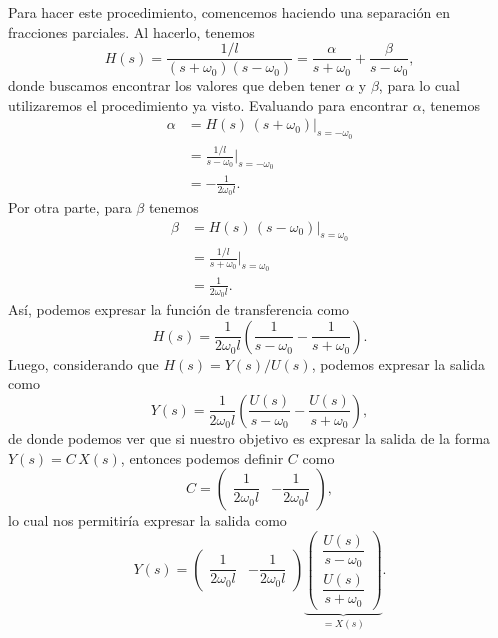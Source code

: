 \documentclass[
  11pt,
  letterpaper,
   addpoints,
  answers
  ]{exam}
\begin{document}
\begin{questions}
\begin{solution}
Para hacer este procedimiento, comencemos haciendo una separación en fracciones parciales. Al hacerlo, tenemos
\begin{equation}
H(s)=\frac{1/l}{(s+\omega_0)(s-\omega_0)}
=\frac{\alpha}{s+\omega_0}+\frac{\beta}{s-\omega_0},
\end{equation}
donde buscamos encontrar los valores que deben tener $\alpha$ y $\beta$, para lo cual utilizaremos el procedimiento ya visto. Evaluando para encontrar $\alpha$, tenemos
\begin{align}
\alpha
&=H(s)\,(s+\omega_0)\big|_{s=-\omega_0}\\
&=\frac{1/l}{s-\omega_0}\Big|_{s=-\omega_0}\\
&=-\frac{1}{2\omega_0 l}.
\end{align}
Por otra parte, para $\beta$ tenemos
\begin{align}
\beta
&=H(s)\,(s-\omega_0)\big|_{s=\omega_0}\\
&=\frac{1/l}{s+\omega_0}\Big|_{s=\omega_0}\\
&=\frac{1}{2\omega_0 l}.
\end{align}
Así, podemos expresar la función de transferencia como
\begin{equation}
H(s)=\frac{1}{2\omega_0 l}\left(\frac{1}{s-\omega_0}-\frac{1}{s+\omega_0}\right).
\end{equation}
Luego, considerando que $H(s)=Y(s)/U(s)$, podemos expresar la salida como
\begin{equation}
Y(s)=\frac{1}{2\omega_0 l}\left(\frac{U(s)}{s-\omega_0}-\frac{U(s)}{s+\omega_0}\right),
\end{equation}
de donde podemos ver que si nuestro objetivo es expresar la salida de la forma $Y(s)=C\,X(s)$, entonces podemos definir $C$ como
\begin{equation}
C=\begin{pmatrix}\dfrac{1}{2\omega_0 l}&-\dfrac{1}{2\omega_0 l}\end{pmatrix},
\end{equation}
lo cual nos permitiría expresar la salida como
\begin{equation}
Y(s)=\begin{pmatrix}\dfrac{1}{2\omega_0 l}&-\dfrac{1}{2\omega_0 l}\end{pmatrix}
\underbrace{
\begin{pmatrix}
\dfrac{U(s)}{s-\omega_0}\\[6pt]
\dfrac{U(s)}{s+\omega_0}
\end{pmatrix}
}_{=X(s)}.
\end{equation}


\end{solution}
\end{questions}
\end{document}
